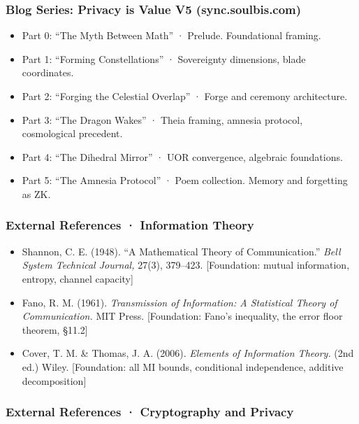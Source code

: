 \documentclass[
  11pt,
]{article}
\providecommand{\tightlist}{%
  \setlength{\itemsep}{0pt}\setlength{\parskip}{0pt}}
\begin{document}
\subsubsection{Blog Series: Privacy is Value V5
(sync.soulbis.com)}\label{blog-series-privacy-is-value-v5-sync.soulbis.com}

\begin{itemize}
\tightlist
\item
  Part 0: ``The Myth Between Math'' · Prelude. Foundational framing.
\item
  Part 1: ``Forming Constellations'' · Sovereignty dimensions, blade
  coordinates.
\item
  Part 2: ``Forging the Celestial Overlap'' · Forge and ceremony
  architecture.
\item
  Part 3: ``The Dragon Wakes'' · Theia framing, amnesia protocol,
  cosmological precedent.
\item
  Part 4: ``The Dihedral Mirror'' · UOR convergence, algebraic
  foundations.
\item
  Part 5: ``The Amnesia Protocol'' · Poem collection. Memory and
  forgetting as ZK.
\end{itemize}

\subsubsection{External References · Information
Theory}\label{external-references-information-theory}

\begin{itemize}
\tightlist
\item
  Shannon, C. E. (1948). ``A Mathematical Theory of Communication.''
  \emph{Bell System Technical Journal,} 27(3), 379--423. {[}Foundation:
  mutual information, entropy, channel capacity{]}
\item
  Fano, R. M. (1961). \emph{Transmission of Information: A Statistical
  Theory of Communication.} MIT Press. {[}Foundation: Fano's inequality,
  the error floor theorem, §11.2{]}
\item
  Cover, T. M. \& Thomas, J. A. (2006). \emph{Elements of Information
  Theory.} (2nd ed.) Wiley. {[}Foundation: all MI bounds, conditional
  independence, additive decomposition{]}
\end{itemize}

\subsubsection{External References · Cryptography and
Privacy}\label{external-references-cryptography-and-privacy}
\end{document}
